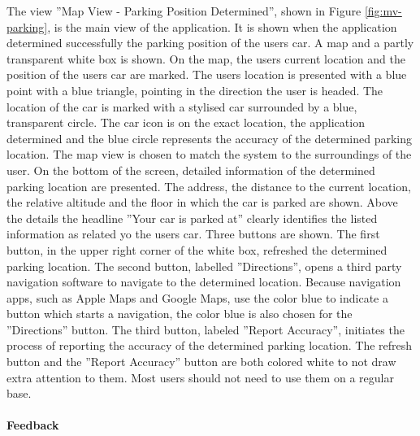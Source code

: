 The view ''Map View - Parking Position Determined'', shown in Figure \ref{fig:mv-parking}, is the main view of the application. It is shown when the application determined successfully the parking position of the users car. A map and a partly transparent white box is shown. On the map, the users current location and the position of the users car are marked. The users location is presented with a blue point with a blue triangle, pointing in the direction the user is headed. The location of the car is marked with a stylised car surrounded by a blue, transparent circle. The car icon is on the exact location, the application determined and the blue circle represents the accuracy of the determined parking location. The map view is chosen to match the system to the surroundings of the user. On the bottom of the screen, detailed information of the determined parking location are presented. The address, the distance to the current location, the relative altitude and the floor in which the car is parked are shown. Above the details the headline ''Your car is parked at'' clearly identifies the listed information as related yo the users car. Three buttons are shown. The first button, in the upper right corner of the white box, refreshed the determined parking location. The second button, labelled ''Directions'', opens a third party navigation software to navigate to the determined location. Because navigation apps, such as Apple Maps and Google Maps, use the color blue to indicate a button which starts a navigation, the color blue is also chosen for the ''Directions'' button. The third button, labeled ''Report Accuracy'', initiates the process of reporting the accuracy of the determined parking location. The refresh button and the ''Report Accuracy'' button are both colored white to not draw extra attention to them. Most users should not need to use them on a regular base. \cite{nielsen1994usability}


\paragraph{Feedback}


